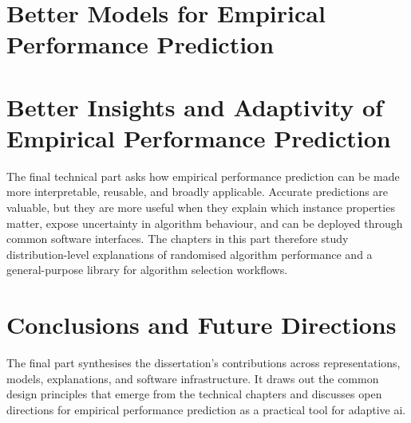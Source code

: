 \documentclass[ twoside,openright,titlepage,numbers=noenddot,headinclude,%
                footinclude=true,cleardoublepage=empty,abstract=false,
                BCOR=5mm,paper=a4,fontsize=11pt,%
                ngerman,american,%
                ]{scrreprt}
\begin{document}





\part{Better Models for Empirical Performance Prediction}







\part{Better Insights and Adaptivity of Empirical Performance Prediction}

\noindent
The final technical part asks how empirical performance prediction can be made more interpretable, reusable, and broadly applicable.
Accurate predictions are valuable, but they are more useful when they explain which instance properties matter, expose uncertainty in algorithm behaviour, and can be deployed through common software interfaces.
The chapters in this part therefore study distribution-level explanations of randomised algorithm performance and a general-purpose library for algorithm selection workflows.





\part{Conclusions and Future Directions}

\noindent
The final part synthesises the dissertation's contributions across representations, models, explanations, and software infrastructure.
It draws out the common design principles that emerge from the technical chapters and discusses open directions for empirical performance prediction as a practical tool for adaptive \gls{ai}.
\end{document}
